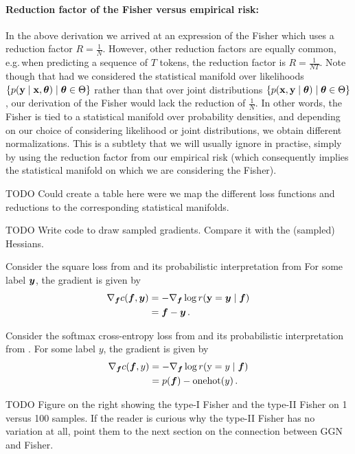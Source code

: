 \paragraph{Reduction factor of the Fisher versus empirical risk:}
In the above derivation we arrived at an expression of the Fisher which uses a reduction factor $R = \frac{1}{N}$.
However, other reduction factors are equally common, e.g.\,when predicting a sequence of $T$ tokens, the reduction factor is $R = \frac{1}{NT}$.
Note though that had we considered the statistical manifold over likelihoods $\{ p({\mathbf{y}} \mid {\mathbf{x}}, {\bm{\theta}}) \mid {\bm{\theta}} \in \Theta \}$ rather than that over joint distributions $\{ p({\mathbf{x}}, {\mathbf{y}} \mid {\bm{\theta}}) \mid {\bm{\theta}} \in \Theta \}$, our derivation of the Fisher would lack the reduction of $\frac{1}{N}$.
In other words, the Fisher is tied to a statistical manifold over probability densities, and depending on our choice of considering likelihood or joint distributions, we obtain different normalizations.
This is a subtlety that we will usually ignore in practise, simply by using the reduction factor from our empirical risk (which consequently implies the statistical manifold on which we are considering the Fisher).

TODO Could create a table here were we map the different loss functions and reductions to the corresponding statistical manifolds.

TODO Write code to draw sampled gradients.
Compare it with the (sampled) Hessians.

\begin{example}
  Consider the square loss from  and its probabilistic interpretation from 
  For some label ${\bm{y}}$, the gradient is given by
  \begin{align*}
    \nabla_{{\bm{f}}} c({\bm{f}}, {\bm{y}})
     & =
    - \nabla_{{\bm{f}}} \log r({\mathbf{y}} ={\bm{y}} \mid {\bm{f}})
    \\
     & =
    {\bm{f}} - {\bm{y}}\,.
  \end{align*}
\end{example}

\begin{example}
  Consider the softmax cross-entropy loss from  and its probabilistic interpretation from . For some label $y$, the gradient is given by
  \begin{align*}
    \nabla_{{\bm{f}}} c({\bm{f}}, y)
     & =
    - \nabla_{{\bm{f}}} \log r({\textnormal{y}} = y \mid {\bm{f}})
    \\
     & =
    p({\bm{f}}) - \mathrm{onehot}(y)\,.
  \end{align*}
\end{example}

TODO Figure on the right showing the type-I Fisher and the type-II Fisher on 1 versus 100 samples.
If the reader is curious why the type-II Fisher has no variation at all, point them to the next section on the connection between GGN and Fisher.
